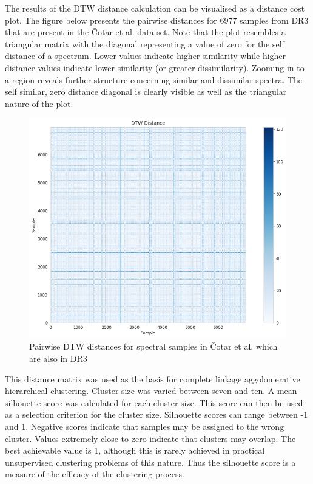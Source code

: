 The results of the DTW distance calculation can be visualised as a distance cost plot. The figure below presents the pairwise distances for 6977 samples from DR3 that are present in the Čotar et al. data set. Note that the plot resembles a triangular matrix with the diagonal representing a value of zero for the self distance of a spectrum. Lower values indicate higher similarity while higher distance values indicate lower similarity (or greater dissimilarity). Zooming in to a region reveals further structure concerning similar and dissimilar spectra. The self similar, zero distance diagonal is clearly visible as well as the triangular nature of the plot.

\begin{figure}[!htb]
\centering
\includegraphics[scale=0.60]{figures/dtw cotar.png}
\caption{Pairwise DTW distances for spectral samples in Čotar et al. which are also in DR3}
\end{figure}

This distance matrix was used as the basis for complete linkage aggolomerative hierarchical clustering. Cluster size was varied between seven and ten. A mean silhouette score was calculated for each cluster size. This score can then be used as a selection criterion for the cluster size. Silhouette scores can range between -1 and 1. Negative scores indicate that samples may be assigned to the wrong cluster. Values extremely close to zero indicate that clusters may overlap. The best achievable value is 1, although this is rarely achieved in practical unsupervised clustering problems of this nature. Thus the silhouette score is a measure of the efficacy of the clustering process.

